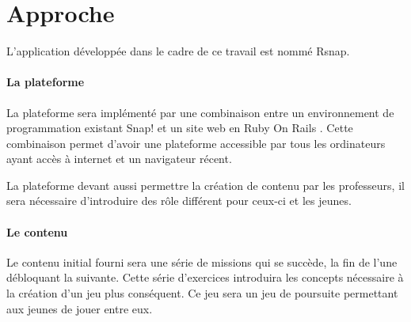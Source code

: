 \section{Approche}
\label{intro-approche}
L'application développée dans le cadre de ce travail est nommé Rsnap.

\paragraph{La plateforme} La plateforme sera implémenté par une combinaison entre un environnement de programmation existant Snap! et un site web en Ruby On Rails \cite{rails}. Cette combinaison permet d'avoir une plateforme accessible par tous les ordinateurs ayant accès à internet et un navigateur récent.

La plateforme devant aussi permettre la création de contenu par les professeurs, il sera nécessaire d'introduire des rôle différent pour ceux-ci et les jeunes.

\paragraph{Le contenu} Le contenu initial fourni sera une série de missions qui se succède, la fin de l'une débloquant la suivante. Cette série d'exercices introduira les concepts nécessaire à la création d'un jeu plus conséquent. Ce jeu sera un jeu de poursuite permettant aux jeunes de jouer entre eux.